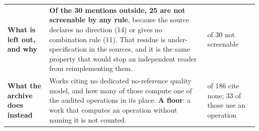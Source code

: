 \begin{table}[!ht]
\begin{tabular}{@{}>{\raggedright\arraybackslash}p{2.2cm}>{\raggedright\arraybackslash}p{6.6cm}>{\raggedright\arraybackslash}p{2.9cm}@{}}
\rowcolor{rowlight}\textbf{What is left out, and why} & \textbf{Of the 30 mentions outside, 25 are not screenable by any rule}, because the source declares no direction (14) or gives no combination rule (11). That residue is under-specification in the sources, and it is the same property that would stop an independent reader from reimplementing them. & 25 of 30 not screenable \\
\textbf{What the archive does instead} & Works citing no dedicated no-reference quality model, and how many of those compute one of the audited operations in its place. \textbf{A floor}: a work that computes an operation without naming it is not counted. & 173 of 186 cite none; 33 of those use an operation \\
\bottomrule
\end{tabular}
\end{table}
